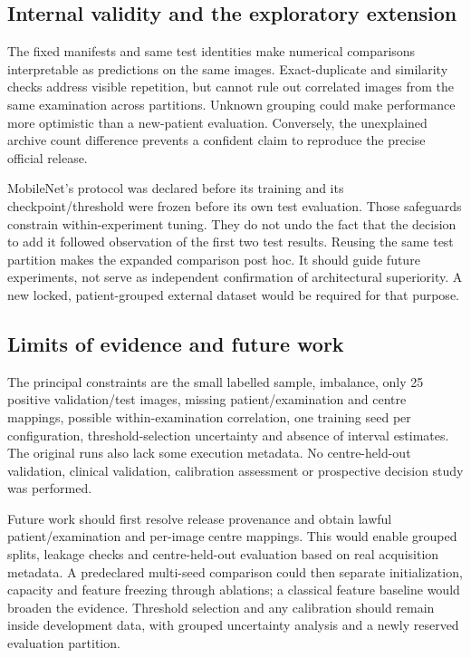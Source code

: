 \documentclass[11pt,a4paper]{article}
\begin{document}
\subsection{Internal validity and the exploratory extension}
The fixed manifests and same test identities make numerical comparisons interpretable as predictions on the same images. Exact-duplicate and similarity checks address visible repetition, but cannot rule out correlated images from the same examination across partitions. Unknown grouping could make performance more optimistic than a new-patient evaluation. Conversely, the unexplained archive count difference prevents a confident claim to reproduce the precise official release.

MobileNet's protocol was declared before its training and its checkpoint/threshold were frozen before its own test evaluation. Those safeguards constrain within-experiment tuning. They do not undo the fact that the decision to add it followed observation of the first two test results. Reusing the same test partition makes the expanded comparison post hoc. It should guide future experiments, not serve as independent confirmation of architectural superiority. A new locked, patient-grouped external dataset would be required for that purpose.

\subsection{Limits of evidence and future work}
The principal constraints are the small labelled sample, imbalance, only 25 positive validation/test images, missing patient/examination and centre mappings, possible within-examination correlation, one training seed per configuration, threshold-selection uncertainty and absence of interval estimates. The original runs also lack some execution metadata. No centre-held-out validation, clinical validation, calibration assessment or prospective decision study was performed.

Future work should first resolve release provenance and obtain lawful patient/examination and per-image centre mappings. This would enable grouped splits, leakage checks and centre-held-out evaluation based on real acquisition metadata. A predeclared multi-seed comparison could then separate initialization, capacity and feature freezing through ablations; a classical feature baseline would broaden the evidence. Threshold selection and any calibration should remain inside development data, with grouped uncertainty analysis and a newly reserved evaluation partition.
\end{document}
